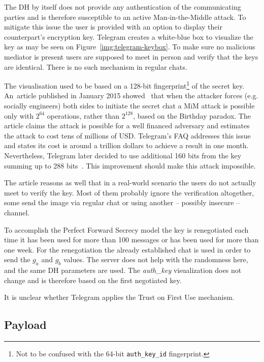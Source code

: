\documentclass[thesis=M,english]{FITthesis}[2012/10/20]
\begin{document}
The DH by itself does not provide any authentication of the communicating parties and is therefore susceptible to an active Man-in-the-Middle attack. To mitigate this issue the user is provided with an option to display their counterpart's encryption key. Telegram creates a white-blue box to visualize the key as may be seen on Figure~\ref{img:telegram-keybox}. To make sure no malicious mediator is present users are supposed to meet in person and verify that the keys are identical. There is no such mechanism in regular chats.

The visualisation used to be based on a 128-bit fingerprint\footnote{Not to be confused with the 64-bit \texttt{auth\_key\_id} fingerprint.} of the secret key. An~article published in January 2015 showed~\cite{telegram-264} that when the attacker forces (e.g. socially engineers) both sides to initiate the secret chat a MiM attack is possible only with $2^{64}$ operations, rather than $2^{128}$, based on the Birthday paradox. The article claims the attack is possible for a well financed adversary and estimates the attack to cost tens of millions of USD. Telegram's FAQ addresses this issue and states its cost is around a trillion dollars to achieve a result in one month. Nevertheless, Telegram later decided to use additional 160 bits from the key summing up to 288 bits~\cite{telegram-techfaq}. This improvement should make this attack impossible.

The article reasons as well that in a real-world scenario the users do not actually meet to verify the key. Most of them probably ignore the verification altogether, some send the image via regular chat or using another -- possibly insecure -- channel.

To accomplish the Perfect Forward Secrecy model the key is renegotiated each time it has been used for more than 100 messages or has been used for more than one week. For the renegotiation the already established chat is used in order to send the $g_a$ and $g_b$ values. The server does not help with the randomness here, and the same DH parameters are used. The \emph{auth\_key} visualization does not change and is therefore based on the first negotiated key.

It is unclear whether Telegram applies the Trust on First Use mechanism.


\subsection{Payload}
\end{document}
